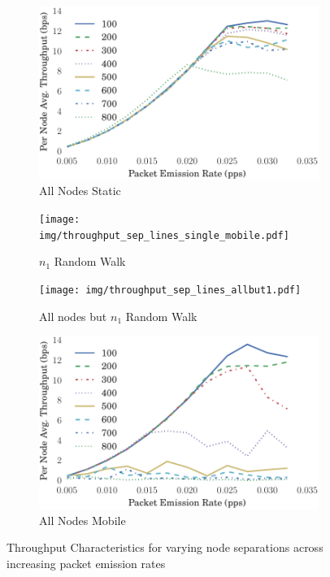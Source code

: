 \documentclass[runningheads,a4paper]{llncs}
\begin{document}
\begin{figure}
\begin{subfigure}{.5\textwidth}
  \centering
  \includegraphics[width=.9\linewidth]{img/throughput_sep_lines_static.pdf}
  \caption{All Nodes Static}
  \label{fig:throughput_static}
\end{subfigure}%
\begin{subfigure}{.5\textwidth}
  \centering
  \texttt{[image: img/throughput\_sep\_lines\_single\_mobile.pdf]}
  \caption{$n_1$ Random Walk}
  \label{fig:throughput_single_mobile}
\end{subfigure}
\begin{subfigure}{.5\textwidth}
\centering
  \texttt{[image: img/throughput\_sep\_lines\_allbut1.pdf]}
  \caption{All nodes but $n_1$ Random Walk}
  \label{fig:throughput_allbut1}
\end{subfigure}
\begin{subfigure}{.5\textwidth}
\centering
  \includegraphics[width=.9\linewidth]{img/throughput_sep_lines_all_mobile.pdf}
  \caption{All Nodes Mobile}
  \label{fig:throughput_all_mobile}
\end{subfigure}
\caption{Throughput Characteristics for varying node separations across increasing packet emission rates}
\label{fig:scenario_throughputs_plain}
\end{figure}
\end{document}
